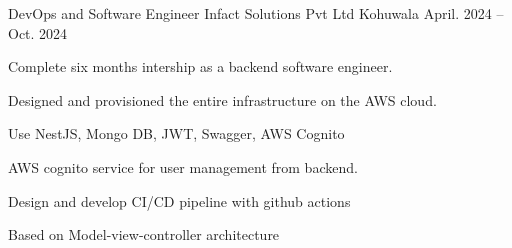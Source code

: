 

\begin{cventries}

  \cventry
    {DevOps and Software Engineer} %
    {Infact Solutions Pvt Ltd} %
    {Kohuwala} %
    {April. 2024 -- Oct. 2024} %

    {
      \begin{cvitems} %
        \item {Complete six months intership as a backend software engineer.}
        \item {Designed and provisioned the entire infrastructure on the AWS cloud.}
        \item {Use NestJS, Mongo DB, JWT, Swagger, AWS Cognito}
        \item {AWS cognito service for user management from backend.}
        \item {Design and develop CI/CD pipeline with github actions}
        \item {Based on Model-view-controller architecture}
      \end{cvitems}
    }

\end{cventries}
